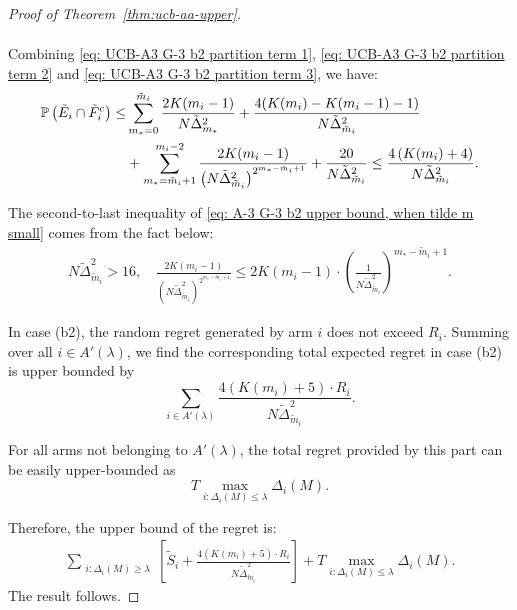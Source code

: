 \documentclass[11pt]{article}
\begin{document}
\begin{proof}[Proof of Theorem~\ref{thm:ucb-aa-upper}]
\begin{itemize}
\begin{align}
\end{align}
Combining \eqref{eq: UCB-A3 G-3 b2 partition term 1}, \eqref{eq: UCB-A3 G-3 b2 partition term 2} and \eqref{eq: UCB-A3 G-3 b2 partition term 3}, we have:
\begin{align}
   \mathbb{P}\left(\tilde{E}_i\cap\tilde{F}_i^c\right)\leq &\sum_{m_*=0}^{\tilde{m}_i} \frac{2K(m_i-1)}{N\tilde{\Delta}_{m_*}^2}+\frac{4(K(m_i)-K(m_i-1)-1)}{N\tilde{\Delta}_{\tilde{m}_i}^2}\notag \\
   &+\sum_{m_*=\tilde{m}_i+1}^{m_i-2}\frac{2K(m_i-1)}{\left(N\tilde{\Delta}_{\tilde{m}_i}^2\right)^{2^{m_*-\tilde{m}_i+1}}}+\frac{20}{N\tilde{\Delta}_{\tilde{m}_i}^2} \leq \frac{4\left(K(m_i)+4\right)}{N\tilde{\Delta}_{\tilde{m}_i}^2}.
   \label{eq: A-3 G-3 b2 upper bound, when tilde m small}
\end{align}


\end{itemize}
The second-to-last inequality of \eqref{eq: A-3 G-3 b2 upper bound, when tilde m small} comes from the fact below:
\begin{align*}
 N\tilde{\Delta}_{\tilde{m}_i}^2>16,\quad   \frac{2K(m_i-1)}{\left(N\tilde{\Delta}_{\tilde{m}_i}^2\right)^{2^{m_*-\tilde{m}_i+1}}}\leq 2K(m_i-1)\cdot \left(\frac{1}{N\tilde{\Delta}_{\tilde{m}_i}^2} \right)^{m_*-\tilde{m}_i+1}.
\end{align*}

In case (b2), the random regret generated by arm \( i \) does not exceed $R_i$. Summing over all $i\in A'(\lambda)$, we find the corresponding total expected regret in case (b2) is upper bounded by
\[\sum_{i \in A'(\lambda)} \frac{4\left(K(m_i)+5\right)\cdot R_i}{N\tilde{\Delta}_{\tilde{m}_i}^2}.\]

For all arms not belonging to \( A'(\lambda) \), the total regret provided by this part can be easily upper-bounded as 
\[ T\max_{i:\Delta_i(M)\leq \lambda}  \Delta_i(M). \] 

Therefore, the upper bound of the regret is: 
\begin{align*}
    \sum_{\substack{i: \Delta_i(M) \geq \lambda}} \left[ \tilde{S}_i+\frac{4\left(K(m_i)+5\right)\cdot R_i}{N\tilde{\Delta}_{\tilde{m}_i}^2}\right] +T\max_{i:\Delta_i(M)\leq \lambda}  \Delta_i(M).
\end{align*}
The result follows. 
\end{proof}
\end{document}

